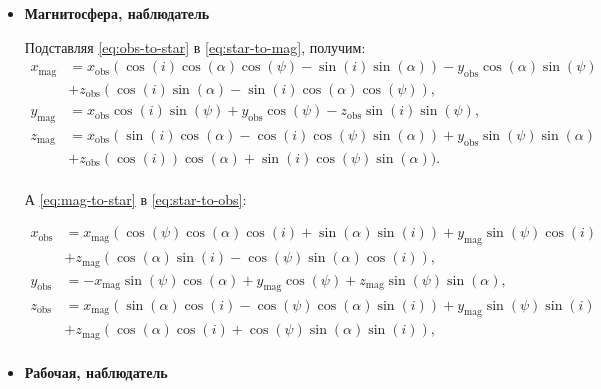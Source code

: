 \documentclass[12pt]{article}
\begin{document}
\begin{itemize}
\item\textbf{Магнитосфера, наблюдатель}

Подставляя \eqref{eq:obs-to-star} в \eqref{eq:star-to-mag}, получим:
%
\begin{equation}\label{eq:obs-to-mag}
\begin{aligned}
x_\text{mag} &= x_\text{obs}(\cos(i)\cos(\alpha)\cos(\psi) - \sin(i)\sin(\alpha)) - y_\text{obs}\cos(\alpha)\sin(\psi) \\
             &+ z_\text{obs}(\cos(i)\sin(\alpha) - \sin(i)\cos(\alpha)\cos(\psi)), \\
y_\text{mag} &= x_\text{obs}\cos(i)\sin(\psi) + y_\text{obs}\cos(\psi) - z_\text{obs}\sin(i)\sin(\psi),  \\
z_\text{mag} &= x_\text{obs}(\sin(i)\cos(\alpha) - \cos(i)\cos(\psi)\sin(\alpha))  + y_\text{obs}\sin(\psi)\sin(\alpha) \\
             &+ z_\text{obs}(\cos(i))\cos(\alpha) + \sin(i)\cos(\psi)\sin(\alpha)). \\
\end{aligned}
\end{equation}

А \eqref{eq:mag-to-star} в \eqref{eq:star-to-obs}:

\begin{equation}\label{eq:mag-to-obs}
\begin{aligned}
x_\text{obs} &= x_\text{mag}(\cos(\psi)\cos(\alpha)\cos(i) + \sin(\alpha)\sin(i)) + y_\text{mag}\sin(\psi)\cos(i) \\
             &+ z_\text{mag}(\cos(\alpha)\sin(i) - \cos(\psi)\sin(\alpha)\cos(i)), \\
y_\text{obs} &= -x_\text{mag}\sin(\psi)\cos(\alpha) + y_\text{mag}\cos(\psi) + z_\text{mag}\sin(\psi)\sin(\alpha), \\
z_\text{obs} &= x_\text{mag}(\sin(\alpha)\cos(i) - \cos(\psi)\cos(\alpha)\sin(i)) + y_\text{mag}\sin(\psi)\sin(i) \\
             &+ z_\text{mag}(\cos(\alpha)\cos(i) + \cos(\psi)\sin(\alpha)\sin(i)), \\
\end{aligned}
\end{equation}

\item \textbf{Рабочая, наблюдатель}


\end{itemize}
\end{document}
